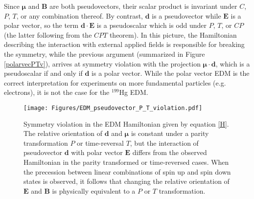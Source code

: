 \documentclass [10pt, twoside] {uwthesis}[2012/04/02]
\begin{document}
Since $\boldsymbol\mu$ and $\mathbf{B}$ are both pseudovectors, their scalar product is invariant under $C$, $P$, $T$, or any combination thereof. By contrast, $\mathbf{d}$ is a pseudovector while $\mathbf{E}$ is a polar vector, so the term $\mathbf{d}\cdot\mathbf{E}$ is a pseudoscalar which is odd under $P$, $T$, or $CP$ (the latter following from the $CPT$ theorem). In this picture, the Hamiltonian describing the interaction with external applied fields is responsible for breaking the symmetry, while the previous argument (summarized in Figure \ref{polarvecPTv}), arrives at symmetry violation with the projection $\boldsymbol\mu\cdot\mathbf{d}$, which is a pseudoscalar if and only if $\mathbf{d}$ is a polar vector. While the polar vector EDM is the correct interpretation for experiments on more fundamental particles (e.g. electrons), it is not the case for the $^{199}$Hg EDM.
\begin{figure}
\begin{center}
\texttt{[image: Figures/EDM\_pseudovector\_P\_T\_violation.pdf]}
\end{center}
\caption[Parity and Time-reversal symmetry violation with a pseudovector EDM]%
{\narrower Symmetry violation in the EDM Hamiltonian given by equation \eqref{H}. The relative orientation of $\mathbf{d}$ and $\boldsymbol{\mu}$ is constant under a parity transformation $P$ or time-reversal $T$, but the interaction of pseudovector $\mathbf{d}$ with polar vector $\mathbf{E}$ differs from the observed Hamiltonian in the parity transformed or time-reversed cases. When the precession between linear combinations of spin up and spin down states is observed, it follows that changing the relative orientation of $\mathbf{E}$ and $\mathbf{B}$ is physically equivalent to a $P$ or $T$ transformation.}
\label{pseudovecPTv}
\end{figure}
\end{document}
